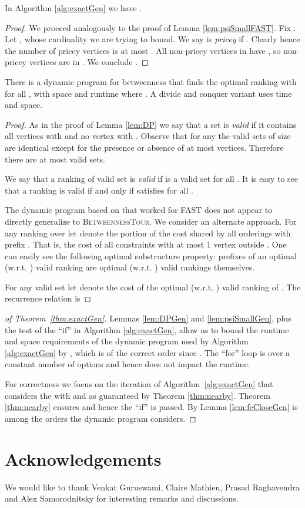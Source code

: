 \documentclass[envcountsame,oribibl]{llncs}
\newcommand{\betTour}{\textsc{BetweennessTour}}
\newcommand{\fast}{\textsc{FAST}}
\begin{document}
\begin{lemma}\label{lem:psiSmallGen}
In Algorithm \ref{alg:exactGen} we have  .
\end{lemma}
\begin{proof}
We proceed analogously to the proof of Lemma \ref{lem:psiSmallFAST}.
Fix . Let , whose cardinality we are trying to bound. We say  is \emph{pricey} if . Clearly  hence the number of pricey vertices is at most . All non-pricey vertices in  have , so  non-pricey vertices are in . We conclude .
\end{proof}

\begin{lemma}\label{lem:DPGen}
There is a dynamic program for betweenness that finds the optimal ranking  with  for all , with space and runtime  where . A divide and conquer variant uses  time and  space.
\end{lemma}

\begin{proof}
As in the proof of Lemma \ref{lem:DP} we say that a set  is \emph{valid} if it contains all vertices  with  and no vertex  with . Observe that for any  the valid sets of size  are identical except for the presence or absence of at most  vertices. Therefore there are at most  valid sets. 

We say that a ranking  of valid set  is \emph{valid} if  is a valid set for all . It is easy to see that a ranking  is valid if and only if satisfies  for all .

The dynamic program based on  that worked for \fast{} does not appear to directly generalize to \betTour. We consider an alternate approach.
For any ranking  over  let  denote the portion of the cost shared by all orderings with prefix . That is, the cost of all constraints with at most 1 vertex outside . One can easily see the following optimal substructure property: prefixes of an optimal (w.r.t. ) valid ranking are optimal (w.r.t. ) valid rankings themselves.

For any valid set  let  denote the  cost of the optimal (w.r.t. ) valid ranking of . The recurrence relation is

\end{proof}

\begin{proof}[of Theorem~\ref{thm:exactGen}]
Lemmas \ref{lem:DPGen} and \ref{lem:psiSmallGen}, plus the test of the ``if'' in Algorithm  \ref{alg:exactGen}, allow us to bound the runtime and space requirements of the dynamic program used by Algorithm \ref{alg:exactGen} by , which is of the correct order since . The ``for'' loop is over a constant number of options and hence does not impact the runtime.

For correctness we focus on the iteration of Algorithm~\ref{alg:exactGen} that considers the  with  and  as guaranteed by Theorem \ref{thm:nearby}. Theorem \ref{thm:nearby} ensures  and hence the ``if'' is passed. By Lemma \ref{lem:feCloseGen}  is among the orders the dynamic program considers.
\end{proof}


\section*{Acknowledgements}
We would like to thank Venkat Guruswami, Claire Mathieu, Prasad Raghavendra and Alex Samorodnitsky for interesting remarks and discussions.

\nocite{Bredereck09}

  
\end{document}
